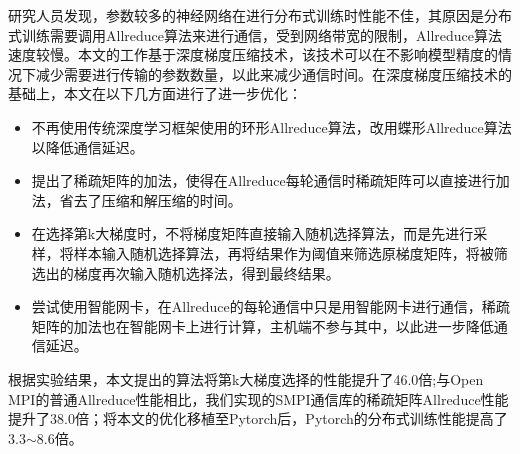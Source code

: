 \begin{cabstract}
  研究人员发现，参数较多的神经网络在进行分布式训练时性能不佳，其原因是分布式训练需要调用Allreduce算法来进行通信，受到网络带宽的限制，Allreduce算法速度较慢。本文的工作基于深度梯度压缩技术，该技术可以在不影响模型精度的情况下减少需要进行传输的参数数量，以此来减少通信时间。在深度梯度压缩技术的基础上，本文在以下几方面进行了进一步优化：
  \begin{itemize}
    \item 不再使用传统深度学习框架使用的环形Allreduce算法，改用蝶形Allreduce算法以降低通信延迟。
    \item 提出了稀疏矩阵的加法，使得在Allreduce每轮通信时稀疏矩阵可以直接进行加法，省去了压缩和解压缩的时间。
    \item 在选择第k大梯度时，不将梯度矩阵直接输入随机选择算法，而是先进行采样，将样本输入随机选择算法，再将结果作为阈值来筛选原梯度矩阵，将被筛选出的梯度再次输入随机选择法，得到最终结果。
    \item 尝试使用智能网卡，在Allreduce的每轮通信中只是用智能网卡进行通信，稀疏矩阵的加法也在智能网卡上进行计算，主机端不参与其中，以此进一步降低通信延迟。
\end{itemize}

根据实验结果，本文提出的算法将第k大梯度选择的性能提升了46.0倍;与Open MPI的普通Allreduce性能相比，我们实现的SMPI通信库的稀疏矩阵Allreduce性能提升了38.0倍；将本文的优化移植至Pytorch后，Pytorch的分布式训练性能提高了3.3$\sim$8.6倍。
\end{cabstract}


